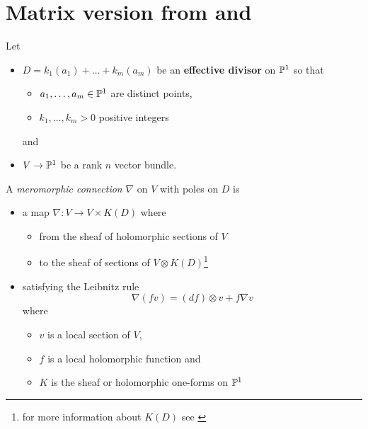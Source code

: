 \section{Matrix version from \cite{boalch} and \cite{thboalch}}
Let
\begin{itemize}
  \item $D=k_1(a_1)+\dots+k_m(a_m)$ be an \textbf{effective divisor} on $\P^1$
    so that
    \begin{itemize}
      \item $a_1,\dots,a_m\in\P^1$ are distinct points,
      \item $k_1,\dots,k_m>0$ positive integers
    \end{itemize}
    and
  \item $V\to\P^1$ be a rank $n$ vector bundle.
\end{itemize}
\begin{defn}[2.1]
  A \emph{meromorphic connection} $\nabla$ on $V$ with poles on $D$ is
  \begin{itemize}
    \item a map $\nabla:V\to V\times K(D)$ where
      \begin{itemize}
        \item from the sheaf of holomorphic sections of $V$
        \item to the sheaf of sections of $V\otimes K(D)$\footnote{for more
          information about $K(D)$ see \cite{beauville1996complex}}
      \end{itemize}
    \item satisfying the Leibnitz rule
      \begin{equation}
        \nabla(fv)=(df)\otimes v + f\nabla v
      \end{equation}
      where
      \begin{itemize}
        \item $v$ is a local section of $V$,
        \item $f$ is a local holomorphic function and
        \item $K$ is the sheaf or holomorphic one-forms on $\P^1$
      \end{itemize}
  \end{itemize}
\end{defn}

